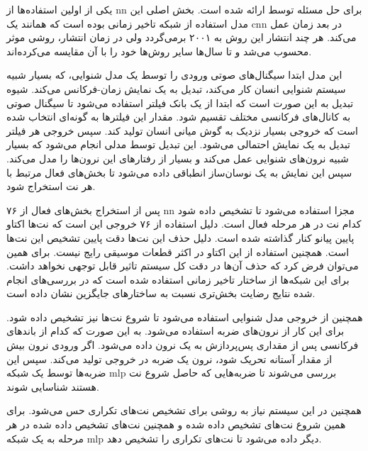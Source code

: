 یکی از اولین استفاده‌ها از \gls{nn} برای حل مسئله توسط
\cite{marolt2004connectionist} ارائه شده است. بخش اصلی این مدل استفاده از شبکه
تاخیر زمانی بوده است که همانند یک \gls{cnn} در بعد زمان عمل می‌کند. هر چند
انتشار این روش به ۲۰۰۱ برمی‌گردد ولی در زمان انتشار، روشی موثر محسوب می‌شد و تا
سال‌ها سایر روش‌ها خود را با آن مقایسه می‌کرده‌اند.

این مدل ابتدا سیگنال‌های صوتی ورودی را توسط یک مدل شنوایی، که بسیار شبیه سیستم
شنوایی انسان کار می‌کند، تبدیل به یک نمایش زمان-فرکانس می‌کند. شیوه تبدیل به این
صورت است که ابتدا از یک بانک فیلتر استفاده می‌شود تا سیگنال صوتی به کانال‌های
فرکانسی مختلف تقسیم شود. مقدار این فیلترها به گونه‌ای انتخاب شده است که خروجی
بسیار نزدیک به گوش میانی انسان تولید کند. سپس خروجی هر فیلتر تبدیل به یک نمایش
احتمالی می‌شود. این تبدیل توسط مدلی انجام می‌شود که بسیار شبیه نرون‌های شنوایی
عمل می‌کند و بسیار از رفتارهای این نرون‌ها را مدل می‌کند. سپس این نمایش به یک
نوسان‌ساز انطباقی داده می‌شود تا بخش‌های فعال مرتبط با هر نت استخراج شود.

پس از استخراج بخش‌های فعال از ۷۶ \gls{nn} مجزا استفاده می‌شود تا تشخیص داده شود
کدام نت در هر مرحله فعال است. دلیل استفاده از ۷۶ خروجی این است که نت‌ها اکتاو
پایین پیانو کنار گذاشته شده است. دلیل حذف این نت‌ها دقت پایین تشخیص  این نت‌ها
است. همچنین استفاده از این اکتاو در اکثر قطعات موسیقی رایج نیست. برای همین
می‌توان فرض کرد که حذف آن‌ها در دقت کل سیستم تاثیر قابل توجهی نخواهد داشت. برای
این شبکه‌ها از ساختار تاخیر زمانی استفاده شده است که در بررسی‌های انجام شده
نتایج رضایت بخش‌تری نسبت به ساختارهای جایگزین نشان داده است.

همچنین از خروجی مدل شنوایی استفاده می‌شود تا شروع نت‌ها نیز تشخیص داده شود. برای
این کار از نرون‌های ضربه استفاده می‌شود. به این صورت که کدام از باندهای فرکانسی
پس از مقداری پس‌پردازش به یک نرون داده می‌شود. اگر ورودی نرون بیش از مقدار
آستانه تحریک شود، نرون یک ضربه در خروجی تولید می‌کند. سپس این ضربه‌ها توسط یک
شبکه \gls{mlp} بررسی می‌شوند تا ضربه‌هایی که حاصل شروع نت هستند شناسایی شوند.

همچنین در این سیستم نیاز به روشی برای تشخیص نت‌های تکراری حس می‌شود. برای همین
شروع نت‌های تشخیص داده شده و همچنین نت‌های تشخیص داده شده در هر مرحله به یک شبکه
\gls{mlp} دیگر داده می‌شود تا نت‌های تکراری را تشخیص دهد.

